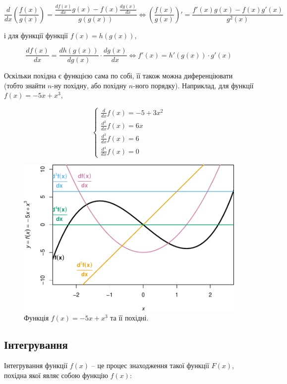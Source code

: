 \documentclass[
  11pt,
]{book}
\begin{document}
\[\frac{d}{dx} \left( \frac{f(x)}{g(x)}\right) = \frac{\frac{df(x)}{dx}g(x) - f(x) \frac{dg(x)}{dx}}{g(g(x))} \iff \left( \frac{f(x)}{g(x)} \right)' = \frac{f'(x)g(x) - f(x)g'(x)}{g^2(x)}\]

і для функції функції \(f(x) = h(g(x))\),

\[\frac{df(x)}{dx} = \frac{dh(g(x))}{dg(x)} \cdot \frac{dg(x)}{dx} \iff f'(x) = h'(g(x)) \cdot g'(x)\]

Оскільки похідна є функцією сама по собі, її також можна диференціювати
(тобто знайти \(n\)-ну похідну, або похідну \(n\)-ного порядку).
Наприклад, для функції \(f(x) = -5x + x^3\),

\[\begin{cases}
\frac{d}{dx}f(x) = -5 + 3x^2 \\
\frac{d^2}{dx}f(x) = 6x \\
\frac{d^3}{dx}f(x) = 6 \\
\frac{d^4}{dx}f(x) = 0
\end{cases}\]

\begin{figure}
\centering
\includegraphics{bookdown-demo_files/figure-latex/fig-3-5-1.pdf}
\caption{Функція \(f(x) = -5x + x^3\) та її похідні.}
\end{figure}

\subsection{Інтегрування}\label{ux456ux43dux442ux435ux433ux440ux443ux432ux430ux43dux43dux44f}

Інтегрування функції \(f(x)\) -- це процес знаходження такої функції
\(F(x)\), похідна якої являє собою функцію \(f(x)\):
\end{document}
